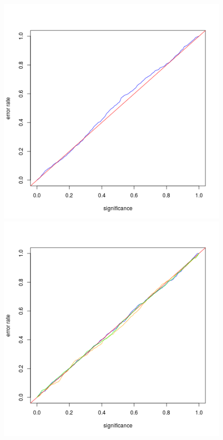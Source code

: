 \documentclass[main]{subfiles}
\begin{document}
\begin{figure}[H]
\begin{center}
  \includegraphics[scale=0.3]{images/pooledCalibrationPlot}
  \includegraphics[scale=0.3]{images/eqSourceInd}

\end{center}
\end{figure}
\end{document}
